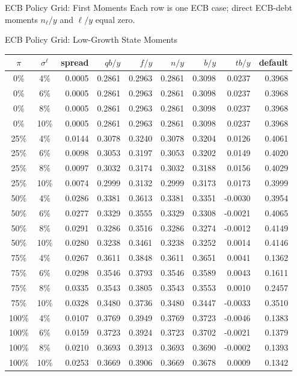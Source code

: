 \begin{frame}{ECB Policy Grid: First Moments}
\vspace{1mm}
{\scriptsize Each row is one ECB case; direct ECB-debt moments $n_\ell/y$ and $\ell/y$ equal zero.}
\end{frame}

\begin{frame}{ECB Policy Grid: Low-Growth State Moments}
\fontsize{6.5pt}{7.2pt}\selectfont
\centering
\begin{tabular}{ccrrrrrrr}
\toprule
$\pi$ & $\sigma^\ell$ & spread & $qb/y$ & $f/y$ & $n/y$ & $b/y$ & $tb/y$ & default \\
\midrule
0\%   & 4\%  & 0.0005 & 0.2861 & 0.2963 & 0.2861 & 0.3098 & 0.0237 & 0.3968 \\
0\%   & 6\%  & 0.0005 & 0.2861 & 0.2963 & 0.2861 & 0.3098 & 0.0237 & 0.3968 \\
0\%   & 8\%  & 0.0005 & 0.2861 & 0.2963 & 0.2861 & 0.3098 & 0.0237 & 0.3968 \\
0\%   & 10\% & 0.0005 & 0.2861 & 0.2963 & 0.2861 & 0.3098 & 0.0237 & 0.3968 \\
\midrule
25\%  & 4\%  & 0.0144 & 0.3078 & 0.3240 & 0.3078 & 0.3204 & 0.0126 & 0.4061 \\
25\%  & 6\%  & 0.0098 & 0.3053 & 0.3197 & 0.3053 & 0.3202 & 0.0149 & 0.4020 \\
25\%  & 8\%  & 0.0097 & 0.3032 & 0.3174 & 0.3032 & 0.3188 & 0.0156 & 0.4029 \\
25\%  & 10\% & 0.0074 & 0.2999 & 0.3132 & 0.2999 & 0.3173 & 0.0173 & 0.3999 \\
\midrule
50\%  & 4\%  & 0.0286 & 0.3381 & 0.3613 & 0.3381 & 0.3351 & -0.0030 & 0.3954 \\
50\%  & 6\%  & 0.0277 & 0.3329 & 0.3555 & 0.3329 & 0.3308 & -0.0021 & 0.4065 \\
50\%  & 8\%  & 0.0291 & 0.3286 & 0.3516 & 0.3286 & 0.3274 & -0.0012 & 0.4149 \\
50\%  & 10\% & 0.0280 & 0.3238 & 0.3461 & 0.3238 & 0.3252 & 0.0014 & 0.4146 \\
\midrule
75\%  & 4\%  & 0.0267 & 0.3611 & 0.3848 & 0.3611 & 0.3651 & 0.0041 & 0.1362 \\
75\%  & 6\%  & 0.0298 & 0.3546 & 0.3793 & 0.3546 & 0.3589 & 0.0043 & 0.1611 \\
75\%  & 8\%  & 0.0335 & 0.3543 & 0.3805 & 0.3543 & 0.3553 & 0.0010 & 0.2457 \\
75\%  & 10\% & 0.0328 & 0.3480 & 0.3736 & 0.3480 & 0.3447 & -0.0033 & 0.3510 \\
\midrule
100\% & 4\%  & 0.0107 & 0.3769 & 0.3949 & 0.3769 & 0.3723 & -0.0046 & 0.1383 \\
100\% & 6\%  & 0.0159 & 0.3723 & 0.3924 & 0.3723 & 0.3702 & -0.0021 & 0.1379 \\
100\% & 8\%  & 0.0210 & 0.3693 & 0.3913 & 0.3693 & 0.3690 & -0.0002 & 0.1393 \\
100\% & 10\% & 0.0253 & 0.3669 & 0.3906 & 0.3669 & 0.3678 & 0.0009 & 0.1342 \\
\bottomrule
\end{tabular}
\end{frame}

